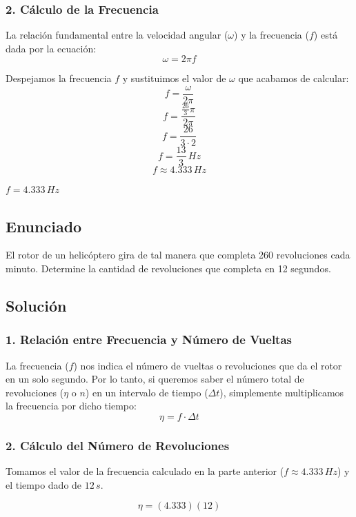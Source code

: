 \documentclass[12pt, a4paper]{article}
\begin{document}
\subsubsection*{2. Cálculo de la Frecuencia}
La relación fundamental entre la velocidad angular ($\omega$) y la frecuencia ($f$) está dada por la ecuación:
$$ \omega = 2\pi f $$

Despejamos la frecuencia $f$ y sustituimos el valor de $\omega$ que acabamos de calcular:
$$ f = \frac{\omega}{2\pi} $$
$$ f = \frac{\frac{26}{3}\pi}{2\pi} $$
$$ f = \frac{26}{3 \cdot 2} $$
$$ f = \frac{13}{3} \, \si{Hz} $$
$$ f \approx 4.333 \, \si{Hz} $$

\begin{tcolorbox}[colback=green!5!white, colframe=green!50!black, title=Respuesta Final]
\centering \Large $f = 4.333 \, \si{Hz}$
\end{tcolorbox}

\newpage

\subsection*{Enunciado}
El rotor de un helicóptero gira de tal manera que completa 260 revoluciones cada minuto. Determine la cantidad de revoluciones que completa en 12 segundos.

\subsection*{Solución}

\subsubsection*{1. Relación entre Frecuencia y Número de Vueltas}
La frecuencia ($f$) nos indica el número de vueltas o revoluciones que da el rotor en un solo segundo. Por lo tanto, si queremos saber el número total de revoluciones ($\eta$ o $n$) en un intervalo de tiempo ($\Delta t$), simplemente multiplicamos la frecuencia por dicho tiempo:
$$ \eta = f \cdot \Delta t $$

\subsubsection*{2. Cálculo del Número de Revoluciones}
Tomamos el valor de la frecuencia calculado en la parte anterior ($f \approx 4.333 \, \si{Hz}$) y el tiempo dado de $12 \, \si{s}$.

$$ \eta = (4.333) (12) $$
\end{document}
